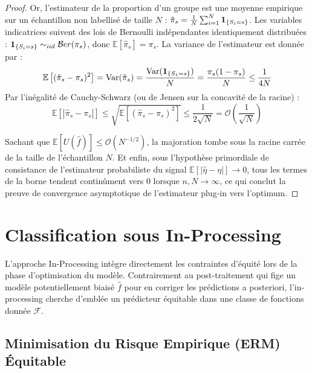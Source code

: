 \begin{proof}
    Or, l'estimateur de la proportion d'un groupe est une moyenne empirique sur un échantillon non labellisé de taille $N$ : $\hat{\pi}_s = \frac{1}{N}\sum_{i=1}^N \mathbf{1}_{\{S_i=s\}}$.
    Les variables indicatrices suivent des lois de Bernoulli indépendantes identiquement distribuées : $\mathbf{1}_{\{S_i=s\}} \sim_{iid} \mathcal{B}er(\pi_s)$, donc $\mathbb{E}[\hat{\pi}_s] = \pi_s$.
    La variance de l'estimateur est donnée par :
    \begin{equation}
        \mathbb{E}\left[(\hat{\pi}_s - \pi_s)^2\right] = \text{Var}(\hat{\pi}_s) = \frac{\text{Var}(\mathbf{1}_{\{S_1=s\}})}{N} = \frac{\pi_s(1-\pi_s)}{N} \le \frac{1}{4N}
    \end{equation}
    Par l'inégalité de Cauchy-Schwarz (ou de Jensen sur la concavité de la racine) :
    \begin{equation}
        \mathbb{E}\left[|\hat{\pi}_s - \pi_s|\right] \le \sqrt{\mathbb{E}\left[(\hat{\pi}_s - \pi_s)^2\right]} \le \frac{1}{2\sqrt{N}} = \mathcal{O}\left(\frac{1}{\sqrt{N}}\right)
    \end{equation}
    
    Sachant que $\mathbb{E}[U(\hat{f})] \le \mathcal{O}(N^{-1/2})$, la majoration tombe sous la racine carrée de la taille de l'échantillon $N$. Et enfin, sous l'hypothèse primordiale de consistance de l'estimateur probabiliste du signal $\mathbb{E}[|\hat{\eta} - \eta|] \to 0$, tous les termes de la borne tendent continûment vers $0$ lorsque $n, N \to \infty$, ce qui conclut la preuve de convergence asymptotique de l'estimateur plug-in vers l'optimum.
\end{proof}

\section{Classification sous In-Processing}

L'approche In-Processing intègre directement les contraintes d'équité lors de la phase d'optimisation du modèle. Contrairement au post-traitement qui fige un modèle potentiellement biaisé $\hat{f}$ pour en corriger les prédictions a posteriori, l'in-processing cherche d'emblée un prédicteur équitable dans une classe de fonctions donnée $\mathcal{F}$.

\subsection{Minimisation du Risque Empirique (ERM) Équitable}

